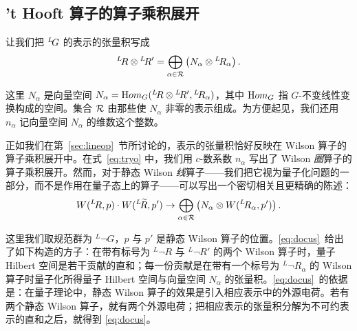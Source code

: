 
\subsection{'t Hooft 算子的算子乘积展开}

\label{sec:opprod}

让我们把 $^L\negthinspace G$ 的表示的张量积写成
\setcounter{equation}{20}
\begin{equation}\label{eq:yurgo}
^L\negthinspace R\otimes {}^L\negthinspace
R'=\bigoplus_{\alpha\in \EUR}\left(N_\alpha \otimes{}^L\negthinspace R_\alpha\right).
\end{equation}

这里 $N_\alpha$ 是向量空间 $N_\alpha={\rm Hom}_G({}^L\neg R\otimes {}^L\neg{R'},{}^L\neg R_\alpha)$，其中 ${\rm Hom}_G$ 指 $G$-不变线性变换构成的空间。集合 $\EUR$ 由那些使 $N_\alpha$ 非零的表示组成。为方便起见，我们还用 $n_\alpha$ 记向量空间 $N_\alpha$ 的维数这个整数。

正如我们在第~\ref{sec:lineop}~节所讨论的，表示的张量积恰好反映在 Wilson 算子的算子乘积展开中。在式~\eqref{eq:tryo} 中，我们用 $c$-数系数 $n_\alpha$ 写出了 Wilson {\it 圈}算子的算子乘积展开。然而，对于静态 Wilson {\it 线}算子——我们把它视为量子化问题的一部分，而不是作用在量子态上的算子——可以写出一个密切相关且更精确的陈述：
\setcounter{equation}{21}
\begin{equation}\label{eq:docus}
W({}^L\neg R,p)\cdot W({}^L\neg\tilde R,p')\to
\bigoplus_{\alpha\in\EUR}\left(N_\alpha\otimes W({}^L\neg
R_\alpha,p')\right).
\end{equation}

这里我们取规范群为 $^L\neg G$，$p$ 与 $p'$ 是静态 Wilson 算子的位置。\eqref{eq:docus}\ 给出了如下构造的方子：在带有标号为 $^L\neg R$ 与 $^L\neg R'$ 的两个 Wilson 算子时，量子 Hilbert 空间是若干贡献的直和；每一份贡献是在带有一个标号为 $^L\neg R_\alpha$ 的 Wilson 算子时量子化所得量子 Hilbert 空间与向量空间 $N_\alpha$ 的张量积。\eqref{eq:docus}\ 的依据是：在量子理论中，静态 Wilson 算子的效果是引入相应表示中的外源电荷。若有两个静态 Wilson 算子，就有两个外源电荷；把相应表示的张量积分解为不可约表示的直和之后，就得到 \eqref{eq:docus}。

